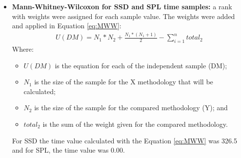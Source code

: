 \begin{itemize}


	
	
	


\item \textbf{Mann-Whitney-Wilcoxon for SSD and SPL time samples:} a rank with weights were assigned for each sample value. The weights were added and applied in Equation \ref{eq:MWW}:
\small
\begin{equation}
\begin{split}
\label{eq:MWW}
U(DM) = N_1 * N_2 + \frac{N_1*(N_1+1)}{2} - \sum_{i=1}^{n} total_{2}
\end{split}
\end{equation}
\normalsize 
Where:
\begin{itemize}
\item \textit{$U(DM)$} is the equation for each of the independent sample (DM);
\item \textit{$N_1$} is the size of the sample for the X methodology that will be calculated;
\item \textit{$N_2$} is the size of the sample for the compared methodology (Y); and
\item \textit{$total_{2}$} is the sum of the weight given for the compared methodology.
\end{itemize}

For SSD the time value calculated with the Equation \ref{eq:MWW} was 326.5 and for SPL, the time value was 0.00.




\end{itemize}
